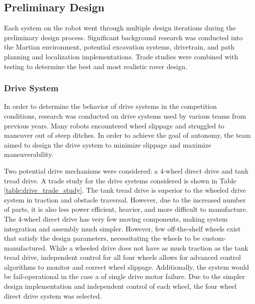 \documentclass[class=article, crop=false]{standalone}
\begin{document}
	\subsection{Preliminary Design}
	\label{subsec:preliminary_design}
	Each system on the robot went through multiple design iterations during the preliminary design process. Significant background research was conducted into the Martian environment, potential excavation systems, drivetrain, and path planning and localization implementations. Trade studies were combined with testing to determine the best and most realistic rover design.
	\subsubsection{Drive System}
In order to determine the behavior of drive systems in the competition conditions, research was conducted on drive systems used by various teams from previous years. Many robots encountered wheel slippage and struggled to maneuver out of steep ditches. In order to achieve the goal of autonomy, the team aimed to design the drive system to minimize slippage and maximize maneuverability.

Two potential drive mechanisms were considered: a 4-wheel direct drive and tank tread drive. A trade study for the drive systems considered is shown in Table \ref{table:drive_trade_study}. The tank tread drive is superior to the wheeled drive system in traction and obstacle traversal. However, due to the increased number of parts, it is also less power efficient, heavier, and more difficult to manufacture. The 4-wheel direct drive has very few moving components, making system integration and assembly much simpler. However, few off-the-shelf wheels exist that satisfy the design parameters, necessitating the wheels to be custom-manufactured. While a wheeled drive does not have as much traction as the tank tread drive, independent control for all four wheels allows for advanced control algorithms to monitor and correct wheel slippage. Additionally, the system would be fail-operational in the case a of single drive motor failure. Due to the simpler design implementation and independent control of each wheel, the four wheel direct drive system was selected.
	 
	 
	 
\end{document}
